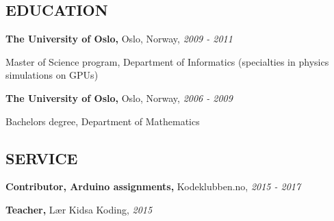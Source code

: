 \documentclass{article}
\newcommand\CVEntry[3]{
  {\bf #1,} #2, {\it #3}
}
\newcommand\CVComment[4]{
  \CVEntry{#1}{#2}{#3}

  #4
}
\begin{document}
\subsection*{EDUCATION}

\begin{addmargin}[2em]{0em}
  \CVComment{The University of Oslo}{Oslo, Norway}{2009 - 2011}{
    Master of Science program, Department of Informatics (specialties in physics simulations on GPUs)}

  \CVComment{The University of Oslo}{Oslo, Norway}{2006 - 2009}{
    Bachelors degree, Department of Mathematics}
\end{addmargin}

\subsection*{SERVICE}

\begin{addmargin}[2em]{0em}
  \CVEntry{Contributor, Arduino assignments}{Kodeklubben.no}{2015 - 2017}

  \CVEntry{Teacher}{L\ae r Kidsa Koding}{2015}
\end{addmargin}
\end{document}
